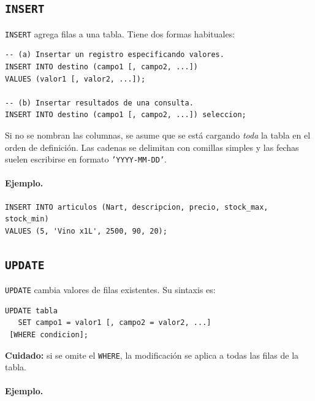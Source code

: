 \documentclass[11pt,a4paper]{article}
\begin{document}
\subsection{\texttt{INSERT}}

\texttt{INSERT} agrega filas a una tabla. Tiene dos formas habituales:

\begin{lstlisting}
-- (a) Insertar un registro especificando valores.
INSERT INTO destino (campo1 [, campo2, ...])
VALUES (valor1 [, valor2, ...]);

-- (b) Insertar resultados de una consulta.
INSERT INTO destino (campo1 [, campo2, ...]) seleccion;
\end{lstlisting}

Si no se nombran las columnas, se asume que se está cargando \emph{toda} la
tabla en el orden de definición. Las cadenas se delimitan con comillas
simples y las fechas suelen escribirse en formato \texttt{'YYYY-MM-DD'}.

\paragraph{Ejemplo.}

\begin{lstlisting}
INSERT INTO articulos (Nart, descripcion, precio, stock_max, stock_min)
VALUES (5, 'Vino x1L', 2500, 90, 20);
\end{lstlisting}

\subsection{\texttt{UPDATE}}

\texttt{UPDATE} cambia valores de filas existentes. Su sintaxis es:

\begin{lstlisting}
UPDATE tabla
   SET campo1 = valor1 [, campo2 = valor2, ...]
 [WHERE condicion];
\end{lstlisting}

\textbf{Cuidado:} si se omite el \texttt{WHERE}, la modificación se aplica a
todas las filas de la tabla.

\paragraph{Ejemplo.}
\end{document}
